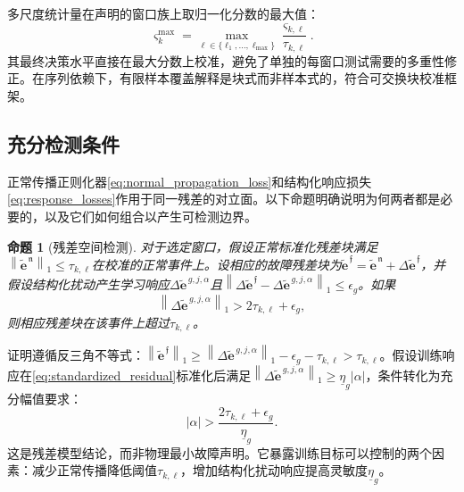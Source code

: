 \documentclass[journal]{IEEEtran}
\newtheorem{proposition}{命题}
\newcommand{\norm}[1]{\left\lVert #1\right\rVert}
\newcommand{\abs}[1]{\left\lvert #1\right\rvert}
\newcommand{\1}{\bm 1}
\begin{document}
多尺度统计量在声明的窗口族上取归一化分数的最大值：
\begin{equation}
\varsigma_k^{\max}=
\max_{\ell\in\{\ell_1,\ldots,\ell_{\max}\}}
\frac{\varsigma_{k,\ell}}{\tau_{k,\ell}}.
\label{eq:multiscale}
\end{equation}
其最终决策水平直接在最大分数上校准，避免了单独的每窗口测试需要的多重性修正。在序列依赖下，有限样本覆盖解释是块式而非样本式的，符合可交换块校准框架\cite{vovk2005,xu2021}。

\subsection{充分检测条件}
正常传播正则化器\eqref{eq:normal_propagation_loss}和结构化响应损失\eqref{eq:response_losses}作用于同一残差的对立面。以下命题明确说明为何两者都是必要的，以及它们如何组合以产生可检测边界。

\begin{proposition}[残差空间检测]
\label{prop:detection}
对于选定窗口，假设正常标准化残差块满足$\norm{\widetilde{\bm e}^{\,\mathfrak n}}_1\leq\tau_{k,\ell}$在校准的正常事件上。设相应的故障残差块为$\widetilde{\bm e}^{\,\mathfrak f}=\widetilde{\bm e}^{\,\mathfrak n}+\Delta\widetilde{\bm e}^{\,\mathfrak f}$，并假设结构化扰动产生学习响应$\Delta\widetilde{\bm e}^{\,g,j,\alpha}$且$\norm{\Delta\widetilde{\bm e}^{\,\mathfrak f}-\Delta\widetilde{\bm e}^{\,g,j,\alpha}}_1\leq\epsilon_g$。如果
\begin{equation}
\norm{\Delta\widetilde{\bm e}^{\,g,j,\alpha}}_1
>2\tau_{k,\ell}+\epsilon_g,
\label{eq:detection_condition}
\end{equation}
则相应残差块在该事件上超过$\tau_{k,\ell}$。
\end{proposition}

证明遵循反三角不等式：$\norm{\widetilde{\bm e}^{\,\mathfrak f}}_1\geq\norm{\Delta\widetilde{\bm e}^{\,g,j,\alpha}}_1-\epsilon_g-\tau_{k,\ell}>\tau_{k,\ell}$。假设训练响应在\eqref{eq:standardized_residual}标准化后满足$\norm{\Delta\widetilde{\bm e}^{\,g,j,\alpha}}_1\geq\underline{\eta}_g\abs{\alpha}$，条件转化为充分幅值要求：
\begin{equation}
\abs{\alpha}>
\frac{2\tau_{k,\ell}+\epsilon_g}{\underline{\eta}_g}.
\label{eq:amplitude_condition}
\end{equation}
这是残差模型结论，而非物理最小故障声明。它暴露训练目标可以控制的两个因素：减少正常传播降低阈值$\tau_{k,\ell}$，增加结构化扰动响应提高灵敏度$\underline{\eta}_g$。
\end{document}
